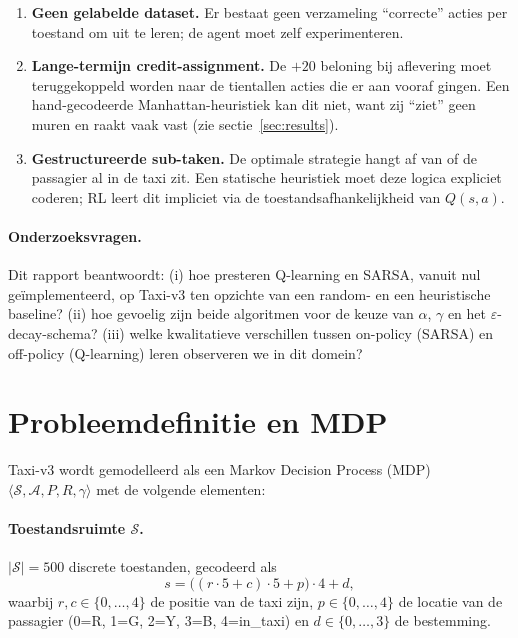 \documentclass[11pt,a4paper]{article}
\begin{document}
\begin{enumerate}
  \item \textbf{Geen gelabelde dataset.} Er bestaat geen verzameling
        ``correcte'' acties per toestand om uit te leren; de agent moet
        zelf experimenteren.
  \item \textbf{Lange-termijn credit-assignment.} De $+20$ beloning bij
        aflevering moet teruggekoppeld worden naar de tientallen acties
        die er aan vooraf gingen. Een hand-gecodeerde Manhattan-heuristiek
        kan dit niet, want zij ``ziet'' geen muren en raakt vaak vast
        (zie sectie~\ref{sec:results}).
  \item \textbf{Gestructureerde sub-taken.} De optimale strategie hangt
        af van of de passagier al in de taxi zit. Een statische heuristiek
        moet deze logica expliciet coderen; RL leert dit impliciet via
        de toestandsafhankelijkheid van $Q(s,a)$.
\end{enumerate}

\paragraph{Onderzoeksvragen.} Dit rapport beantwoordt:
(i) hoe presteren Q-learning en SARSA, vanuit nul ge\"implementeerd, op
Taxi-v3 ten opzichte van een random- en een heuristische baseline?
(ii) hoe gevoelig zijn beide algoritmen voor de keuze van $\alpha$,
$\gamma$ en het $\varepsilon$-decay-schema?
(iii) welke kwalitatieve verschillen tussen on-policy (SARSA) en
off-policy (Q-learning) leren observeren we in dit domein?

\section{Probleemdefinitie en MDP}
\label{sec:mdp}

Taxi-v3 wordt gemodelleerd als een Markov Decision Process (MDP)
$\langle \mathcal{S}, \mathcal{A}, P, R, \gamma \rangle$ met de
volgende elementen:

\paragraph{Toestandsruimte $\mathcal{S}$.}
$|\mathcal{S}| = 500$ discrete toestanden, gecodeerd als
\begin{equation}
  s = \bigl((r \cdot 5 + c) \cdot 5 + p\bigr) \cdot 4 + d,
\end{equation}
waarbij $r, c \in \{0,\dots,4\}$ de positie van de taxi zijn,
$p \in \{0,\dots,4\}$ de locatie van de passagier (0=R, 1=G, 2=Y,
3=B, 4=in\_taxi) en $d \in \{0,\dots,3\}$ de bestemming.
\end{document}

